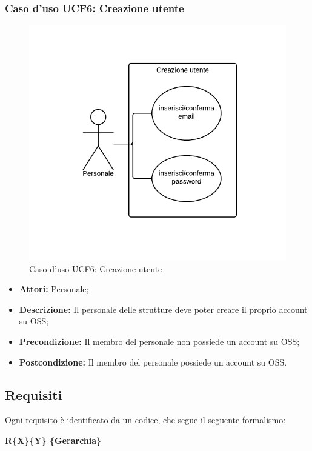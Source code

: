 \subsubsection{Caso d'uso UCF6: Creazione utente}
\begin{figure}[H]
\centering
\includegraphics[width=1\textwidth]{images/UCF6.png}
\caption{Caso d'uso UCF6: Creazione utente}
\end{figure}

\begin{itemize}
\item \textbf{Attori:} Personale;
\item \textbf{Descrizione:} Il personale delle strutture deve poter creare il proprio account su OSS;
\item \textbf{Precondizione:} Il membro del personale non possiede un account su OSS;
\item \textbf{Postcondizione:} Il membro del personale possiede un account su OSS.
\end{itemize}

\subsection{Requisiti}
Ogni requisito è identificato da un codice, che segue il seguente formalismo:

\begin{center}
\textbf{R\{X\}\{Y\} \{Gerarchia\}}
\end{center}

